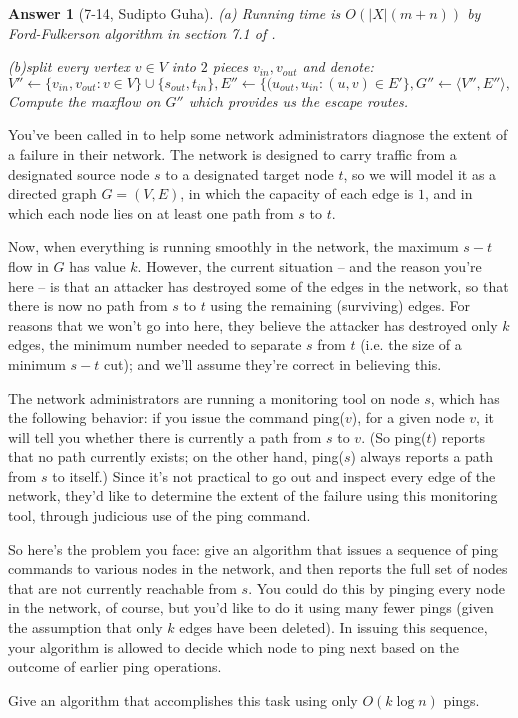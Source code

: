 \documentclass[11pt]{article}
\theoremstyle{numberplain}
\theoremstyle{nonumberplain}
\newtheorem{ans}{Answer}
\newcommand{\0}{{\mathbf{0}}}
\begin{document}
\begin{ans}[7-14, Sudipto Guha]
(a) Running time is $O(|X|(m+n))$ by Ford-Fulkerson algorithm in section 7.1 of \cite{jon2005algorithm}.
\par 
(b)split every vertex $v\in V$ into $2$ pieces $v_{in},v_{out}$ and denote:
 $$V''\leftarrow \{v_{in},v_{out}:v\in V\}\cup \{s_{out},t_{in}\}, E''\leftarrow \{(u_{out},u_{in}:(u,v)\in E'\},G''\leftarrow \langle V'',E''\rangle,$$
Compute the maxflow on $G''$ which provides us the escape routes.
\end{ans}
\begin{ques}[HW5, 7-17]
You've been called in to help some network administrators diagnose the extent of a failure in their network. The network is designed to carry traffic from a designated source node $s$ to a designated target node $t$, so we will model it as a directed graph $G = (V,E)$, in which the capacity of each edge is $1$, and in which each node lies on at least one path from $s$ to $t$.
\par
Now, when everything is running smoothly in the network, the maximum $s-t$ flow in $G$ has value $k$. However, the current situation -- and the reason you're here -- is that an attacker has destroyed some of the edges in the network, so that there is now no path from $s$ to $t$ using the remaining (surviving) edges. For reasons that we won't go into here, they believe the attacker has destroyed only $k$ edges, the minimum number needed to separate $s$ from $t$ (i.e. the size of a minimum $s-t$ cut); and we'll assume they're correct in believing this.
\par
The network administrators are running a monitoring tool on node $s$, which has the following behavior: if you issue the command ping($v$), for a given node $v$, it will tell you whether there is currently a path from $s$ to $v$. (So ping($t$) reports that no path currently exists; on the other hand, ping($s$) always reports a path from $s$ to itself.) Since it's not practical to go out and inspect every edge of the network, they'd like to determine the extent of the failure using this monitoring tool, through judicious use of the ping command.
\par
So here's the problem you face: give an algorithm that issues a sequence of ping commands to various nodes in the network, and then reports the full set of nodes that are not currently reachable from $s$. You could do this by pinging every node in the network, of course, but you'd like to do it using many fewer pings (given the assumption that only $k$ edges have been deleted). In issuing this sequence, your algorithm is allowed to decide which node to ping next based on the outcome of earlier ping operations.
\par
Give an algorithm that accomplishes this task using only $O(k \log n)$ pings. 
\end{ques}
\end{document}
